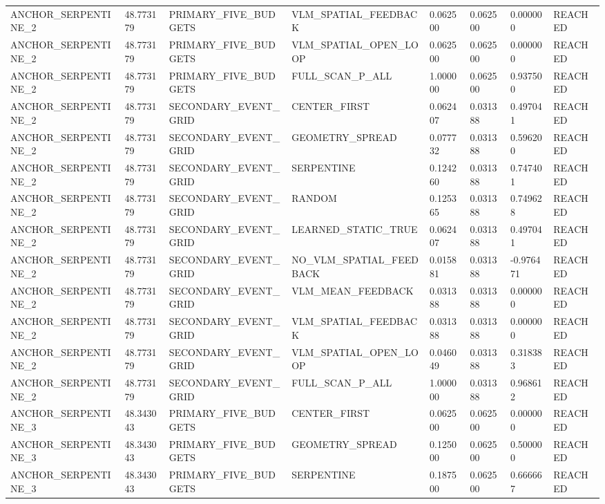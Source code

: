 \begin{tabular}{llllllll}
ANCHOR\_SERPENTINE\_2 & 48.773179 & PRIMARY\_FIVE\_BUDGETS & VLM\_SPATIAL\_FEEDBACK & 0.062500 & 0.062500 & 0.000000 & REACHED \\
ANCHOR\_SERPENTINE\_2 & 48.773179 & PRIMARY\_FIVE\_BUDGETS & VLM\_SPATIAL\_OPEN\_LOOP & 0.062500 & 0.062500 & 0.000000 & REACHED \\
ANCHOR\_SERPENTINE\_2 & 48.773179 & PRIMARY\_FIVE\_BUDGETS & FULL\_SCAN\_P\_ALL & 1.000000 & 0.062500 & 0.937500 & REACHED \\
ANCHOR\_SERPENTINE\_2 & 48.773179 & SECONDARY\_EVENT\_GRID & CENTER\_FIRST & 0.062407 & 0.031388 & 0.497041 & REACHED \\
ANCHOR\_SERPENTINE\_2 & 48.773179 & SECONDARY\_EVENT\_GRID & GEOMETRY\_SPREAD & 0.077732 & 0.031388 & 0.596200 & REACHED \\
ANCHOR\_SERPENTINE\_2 & 48.773179 & SECONDARY\_EVENT\_GRID & SERPENTINE & 0.124260 & 0.031388 & 0.747401 & REACHED \\
ANCHOR\_SERPENTINE\_2 & 48.773179 & SECONDARY\_EVENT\_GRID & RANDOM & 0.125365 & 0.031388 & 0.749628 & REACHED \\
ANCHOR\_SERPENTINE\_2 & 48.773179 & SECONDARY\_EVENT\_GRID & LEARNED\_STATIC\_TRUE & 0.062407 & 0.031388 & 0.497041 & REACHED \\
ANCHOR\_SERPENTINE\_2 & 48.773179 & SECONDARY\_EVENT\_GRID & NO\_VLM\_SPATIAL\_FEEDBACK & 0.015881 & 0.031388 & -0.976471 & REACHED \\
ANCHOR\_SERPENTINE\_2 & 48.773179 & SECONDARY\_EVENT\_GRID & VLM\_MEAN\_FEEDBACK & 0.031388 & 0.031388 & 0.000000 & REACHED \\
ANCHOR\_SERPENTINE\_2 & 48.773179 & SECONDARY\_EVENT\_GRID & VLM\_SPATIAL\_FEEDBACK & 0.031388 & 0.031388 & 0.000000 & REACHED \\
ANCHOR\_SERPENTINE\_2 & 48.773179 & SECONDARY\_EVENT\_GRID & VLM\_SPATIAL\_OPEN\_LOOP & 0.046049 & 0.031388 & 0.318383 & REACHED \\
ANCHOR\_SERPENTINE\_2 & 48.773179 & SECONDARY\_EVENT\_GRID & FULL\_SCAN\_P\_ALL & 1.000000 & 0.031388 & 0.968612 & REACHED \\
ANCHOR\_SERPENTINE\_3 & 48.343043 & PRIMARY\_FIVE\_BUDGETS & CENTER\_FIRST & 0.062500 & 0.062500 & 0.000000 & REACHED \\
ANCHOR\_SERPENTINE\_3 & 48.343043 & PRIMARY\_FIVE\_BUDGETS & GEOMETRY\_SPREAD & 0.125000 & 0.062500 & 0.500000 & REACHED \\
ANCHOR\_SERPENTINE\_3 & 48.343043 & PRIMARY\_FIVE\_BUDGETS & SERPENTINE & 0.187500 & 0.062500 & 0.666667 & REACHED \\

\end{tabular}
